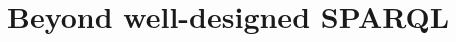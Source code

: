 \documentclass[draft,final]{vutinfth} %
\begin{document}
\chapter{Beyond well-designed SPARQL}


\backmatter

\listoffigures %

\listoftables %

\listofalgorithms
{}

\printindex

\printglossaries



\end{document}
